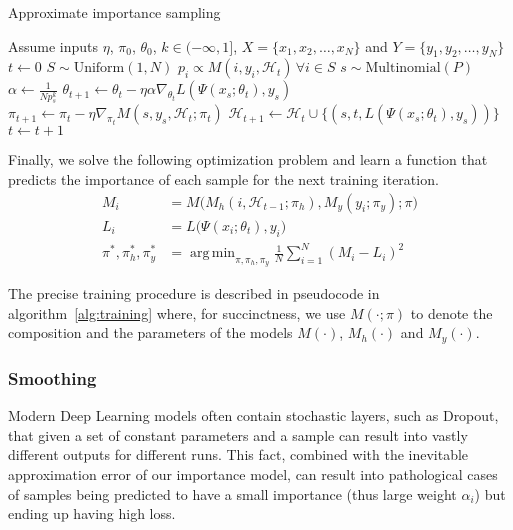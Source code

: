 \documentclass{article}
\DeclareMathOperator*{\argmin}{arg\,min}
\begin{document}
\begin{algorithm}
\caption{Approximate importance sampling} \label{alg:training}
\begin{algorithmic}[1]
    \State Assume inputs $\eta$, $\pi_0$, $\theta_0$, $k \in (-\infty, 1]$, $X = \{x_1,
           x_2, \dots, x_N\}$ and $Y = \{y_1, y_2, \dots, y_N\}$
    \State $t \gets 0$
    \Repeat
        \State $S \sim \text{Uniform}(1, N)$
        \State $p_i \propto M(i, y_i, \mathcal{H}_t) \, \forall i \in S$
        \State $s \sim \text{Multinomial}(P)$ \label{alg:sample}
        \State $\alpha \gets \frac{1}{N p_s^k}$
        \State $\theta_{t+1} \gets \theta_t - \eta \alpha \nabla_{\theta_t}
            L(\Psi(x_s ; \theta_t), y_s)$ \label{alg:sgd1}
        \State $\pi_{t+1} \gets \pi_t - \eta \nabla_{\pi_t}
            M(s, y_s, \mathcal{H}_t; \pi_t)$ \label{alg:sgd2}
        \State $\mathcal{H}_{t+1} \gets \mathcal{H}_t \cup
            \{(s, t, L(\Psi(x_s ; \theta_t), y_s))\}$
        \State $t \gets t + 1$
\end{algorithmic}
\end{algorithm}

Finally, we solve the following optimization problem and learn a function that
predicts the importance of each sample for the next training iteration.
\begin{equation} \label{eq:approx_training}
\begin{aligned}
M_i &= M\big( M_h(i, \mathcal{H}_{t-1}; \pi_h), M_y(y_i; \pi_y) ; \pi \big) \\
L_i &= L\big(\Psi(x_i; \theta_t), y_i\big) \\
\pi^*, \pi_h^*, \pi_y^* &= \argmin_{\pi, \pi_h, \pi_y} \frac{1}{N} \sum_{i=1}^N 
    (M_i - L_i)^2
\end{aligned}
\end{equation}

The precise training procedure is described in pseudocode in
algorithm~\ref{alg:training} where, for succinctness, we use $M(\cdot; \pi)$ to
denote the composition and the parameters of the models $M(\cdot)$,
$M_h(\cdot)$ and $M_y(\cdot)$.

\subsubsection{Smoothing} \label{sec:smoothing}

Modern Deep Learning models often contain stochastic layers, such as Dropout,
that given a set of constant parameters and a sample can result into vastly
different outputs for different runs. This fact, combined with the inevitable
approximation error of our importance model, can result into pathological cases
of samples being predicted to have a small importance (thus large weight
$\alpha_i$) but ending up having high loss.
\end{document}
